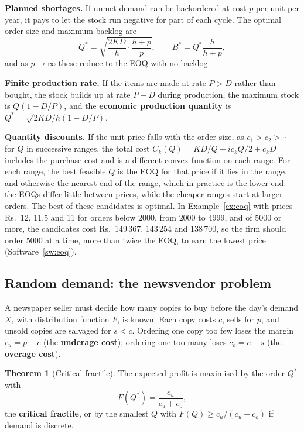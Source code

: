 \documentclass[11pt,a4paper]{article}
\numberwithin{equation}{section}
\theoremstyle{definition}
\newtheorem{thm}{Theorem}[subsection]
\begin{document}
\textbf{Planned shortages.} If unmet demand can be backordered at cost $p$ per unit per year, it pays to let the stock run negative for part of each cycle. The optimal order size and maximum backlog are
\[
Q^* = \sqrt{\frac{2KD}h\cdot\frac{h + p}p}, \qquad B^* = Q^*\frac h{h + p} ,
\]
and as $p \to \infty$ these reduce to the EOQ with no backlog.

\textbf{Finite production rate.} If the items are made at rate $P > D$ rather than bought, the stock builds up at rate $P - D$ during production, the maximum stock is $Q(1 - D/P)$, and the \textbf{economic production quantity} is $Q^* = \sqrt{2KD/h(1 - D/P)}$.

\textbf{Quantity discounts.} If the unit price falls with the order size, as $c_1 > c_2 > \cdots$ for $Q$ in successive ranges, the total cost $C_k(Q) = KD/Q + ic_kQ/2 + c_kD$ includes the purchase cost and is a different convex function on each range. For each range, the best feasible $Q$ is the EOQ for that price if it lies in the range, and otherwise the nearest end of the range, which in practice is the lower end: the EOQs differ little between prices, while the cheaper ranges start at larger orders. The best of these candidates is optimal. In Example~\ref{ex:eoq} with prices Rs.~12, 11.5 and 11 for orders below $2000$, from $2000$ to $4999$, and of $5000$ or more, the candidates cost Rs.~149\,367, 143\,254 and 138\,700, so the firm should order
$5000$ at a time, more than twice the EOQ, to earn the lowest price (Software~\ref{sw:eoq}).

\subsection{Random demand: the newsvendor problem}
\label{ssec:newsvendor}

A newspaper seller must decide how many copies to buy before the day's demand $X$, with distribution function $F$, is known. Each copy costs $c$, sells for $p$, and unsold copies are salvaged for $s < c$. Ordering one copy too few loses the margin $c_u = p - c$ (the \textbf{underage cost}); ordering one too many loses $c_o = c - s$ (the
\textbf{overage cost}).

\begin{thm}[Critical fractile]
\label{thm:newsvendor}
The expected profit is maximised by the order $Q^*$ with
\[
F(Q^*) = \frac{c_u}{c_u + c_o} ,
\]
the \textbf{critical fractile}, or by the smallest $Q$ with $F(Q) \geq c_u/(c_u + c_o)$ if demand is discrete.
\end{thm}
\end{document}
